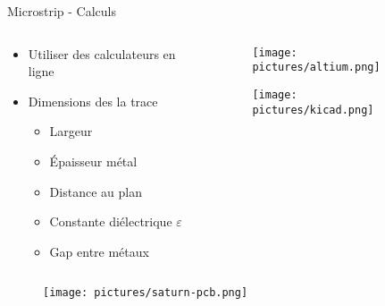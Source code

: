 \begin{frame}{Microstrip - Calculs}
    \begin{columns}
        \begin{column}{0.5\textwidth}
            \begin{itemize}
                \item Utiliser des calculateurs en ligne
                \item Dimensions des la trace
                \begin{itemize}
                    \item Largeur
                    \item Épaisseur métal
                    \item Distance au plan
                    \item Constante diélectrique $\varepsilon$
                    \item Gap entre métaux
                \end{itemize}
            \end{itemize}
        \end{column}
        \begin{column}{0.5\textwidth}
            \begin{figure}
                \centering
                \texttt{[image: pictures/altium.png]}
            \end{figure}
            \vspace{-12pt}
            \begin{figure}
                \centering
                \texttt{[image: pictures/kicad.png]}
            \end{figure}
        \end{column}
    \end{columns}

    \begin{figure}
        \centering
        \texttt{[image: pictures/saturn-pcb.png]}
    \end{figure}
\end{frame}

